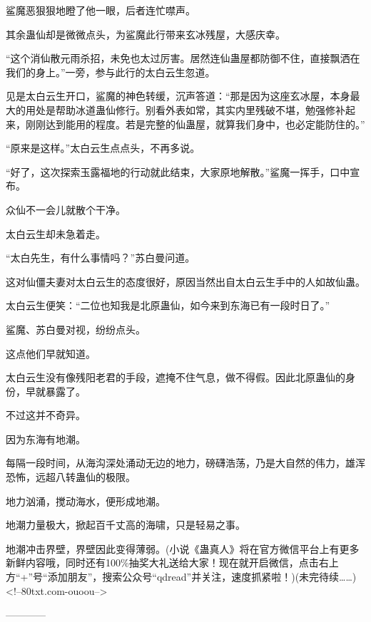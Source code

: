 \begin{this_body}
鲨魔恶狠狠地瞪了他一眼，后者连忙噤声。

其余蛊仙却是微微点头，为鲨魔此行带来玄冰残屋，大感庆幸。

“这个消仙散元雨杀招，未免也太过厉害。居然连仙蛊屋都防御不住，直接飘洒在我们的身上。”一旁，参与此行的太白云生忽道。

见是太白云生开口，鲨魔的神色转缓，沉声答道：“那是因为这座玄冰屋，本身最大的用处是帮助冰道蛊仙修行。别看外表如常，其实内里残破不堪，勉强修补起来，刚刚达到能用的程度。若是完整的仙蛊屋，就算我们身中，也必定能防住的。”

“原来是这样。”太白云生点点头，不再多说。

“好了，这次探索玉露福地的行动就此结束，大家原地解散。”鲨魔一挥手，口中宣布。

众仙不一会儿就散个干净。

太白云生却未急着走。

“太白先生，有什么事情吗？”苏白曼问道。

这对仙僵夫妻对太白云生的态度很好，原因当然出自太白云生手中的人如故仙蛊。

太白云生便笑：“二位也知我是北原蛊仙，如今来到东海已有一段时日了。”

鲨魔、苏白曼对视，纷纷点头。

这点他们早就知道。

太白云生没有像残阳老君的手段，遮掩不住气息，做不得假。因此北原蛊仙的身份，早就暴露了。

不过这并不奇异。

因为东海有地潮。

每隔一段时间，从海沟深处涌动无边的地力，磅礴浩荡，乃是大自然的伟力，雄浑恐怖，远超八转蛊仙的极限。

地力汹涌，搅动海水，便形成地潮。

地潮力量极大，掀起百千丈高的海啸，只是轻易之事。

地潮冲击界壁，界壁因此变得薄弱。(小说《蛊真人》将在官方微信平台上有更多新鲜内容哦，同时还有100\%抽奖大礼送给大家！现在就开启微信，点击右上方“+”号“添加朋友”，搜索公众号“qdread”并关注，速度抓紧啦！)(未完待续……)<!--80txt.com-ouoou-->

------------

\end{this_body}

